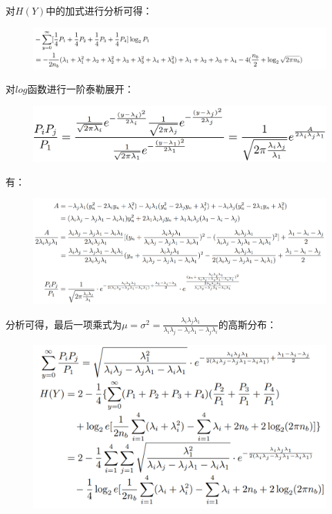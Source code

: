 \documentclass[12pt]{article}
\begin{document}
对$H(Y)$中的加式进行分析可得：\par
\begin{figure}[htp]
    \centering
    \includegraphics[width=20cm]{4.png}
\end{figure}
对$log$函数进行一阶泰勒展开：\par
\begin{figure}[htp]
    \centering
    \includegraphics[width=14cm]{5.png}
\end{figure}
\newpage
有：\par
\begin{figure}[htpb]
    \flushleft 
    \includegraphics[width=18.8cm]{6.png}
\end{figure}
分析可得，最后一项乘式为$\mu=\sigma^2=\frac{\lambda_i\lambda_j\lambda_1}{\lambda_i\lambda_j-\lambda_i\lambda_1-\lambda_j\lambda_i}$的高斯分布：\par
\begin{figure}[htpb]
    \flushleft 
    \includegraphics[width=15cm]{7.png}
\end{figure}
\end{document}
